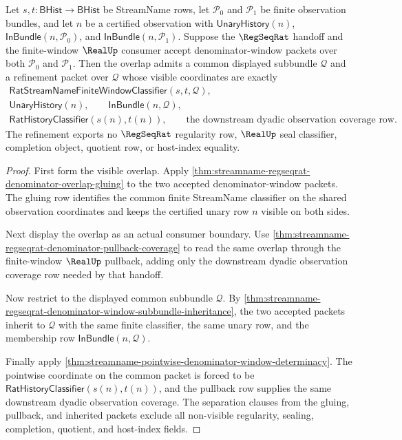 \begin{theorem}
\label{thm:streamname-regseqrat-denominator-common-refinement}
Let $s,t:\mathsf{BHist}\to\mathsf{BHist}$ be StreamName rows, let
$\mathcal P_0$ and $\mathcal P_1$ be finite observation bundles, and let
$n$ be a certified observation with $\mathsf{UnaryHistory}(n)$,
$\mathsf{InBundle}(n,\mathcal P_0)$, and
$\mathsf{InBundle}(n,\mathcal P_1)$. Suppose the $\RegSeqRat$ handoff and the
finite-window $\RealUp$ consumer accept denominator-window packets over both
$\mathcal P_0$ and $\mathcal P_1$. Then the overlap admits a common displayed
subbundle $\mathcal Q$ and a refinement packet over $\mathcal Q$ whose visible
coordinates are exactly
$$
\begin{gathered}
\mathsf{RatStreamNameFiniteWindowClassifier}(s,t,\mathcal Q),\\
\mathsf{UnaryHistory}(n),\qquad
\mathsf{InBundle}(n,\mathcal Q),\\
\mathsf{RatHistoryClassifier}(s(n),t(n)),\qquad
\text{the downstream dyadic observation coverage row.}
\end{gathered}
$$
The refinement exports no $\RegSeqRat$ regularity row, $\RealUp$ seal
classifier, completion object, quotient row, or host-index equality.
\end{theorem}
\begin{proof}
First form the visible overlap. Apply
\autoref{thm:streamname-regseqrat-denominator-overlap-gluing} to the two
accepted denominator-window packets. The gluing row identifies the common
finite StreamName classifier on the shared observation coordinates and keeps
the certified unary row $n$ visible on both sides.

Next display the overlap as an actual consumer boundary. Use
\autoref{thm:streamname-regseqrat-denominator-pullback-coverage} to read the
same overlap through the finite-window $\RealUp$ pullback, adding only the
downstream dyadic observation coverage row needed by that handoff.

Now restrict to the displayed common subbundle $\mathcal Q$. By
\autoref{thm:streamname-regseqrat-denominator-window-subbundle-inheritance},
the two accepted packets inherit to $\mathcal Q$ with the same finite
classifier, the same unary row, and the membership row
$\mathsf{InBundle}(n,\mathcal Q)$.

Finally apply
\autoref{thm:streamname-pointwise-denominator-window-determinacy}. The
pointwise coordinate on the common packet is forced to be
$\mathsf{RatHistoryClassifier}(s(n),t(n))$, and the pullback row supplies the
same downstream dyadic observation coverage. The separation clauses from the
gluing, pullback, and inherited packets exclude all non-visible regularity,
sealing, completion, quotient, and host-index fields.
\end{proof}

